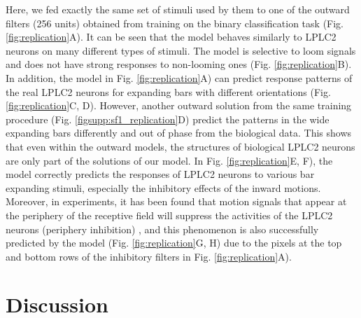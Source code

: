 \documentclass[9pt,lineno]{elife}
\begin{document}
Here, we fed exactly the same set of stimuli used by them to one of the outward filters (256 units) obtained from training on the binary classification task (Fig. \ref{fig:replication}A). It can be seen that the model behaves similarly to LPLC2 neurons on many different types of stimuli. The model is selective to loom signals and does not have strong responses to non-looming ones (Fig. \ref{fig:replication}B). In addition, the model in Fig. \ref{fig:replication}A) can predict response patterns of the real LPLC2 neurons for expanding bars with different orientations (Fig. \ref{fig:replication}C, D). However, another outward solution from the same training procedure (Fig. \ref{figsupp:sf1_replication}D) predict the patterns in the wide expanding bars differently and out of phase from the biological data. This shows that even within the outward models, the structures of biological LPLC2 neurons are only part of the solutions of our model. In Fig. \ref{fig:replication}E, F), the model correctly predicts the responses of LPLC2 neurons to various bar expanding stimuli, especially the inhibitory effects of the inward motions. Moreover, in experiments, it has been found that motion signals that appear at the periphery of the receptive field will suppress the activities of the LPLC2 neurons (periphery inhibition) \citep{klapoetke2017ultra}, and this phenomenon is also successfully predicted by the model (Fig. \ref{fig:replication}G, H) due to the pixels at the top and bottom rows of the inhibitory filters in Fig. \ref{fig:replication}A).


\section{Discussion}

\end{document}
